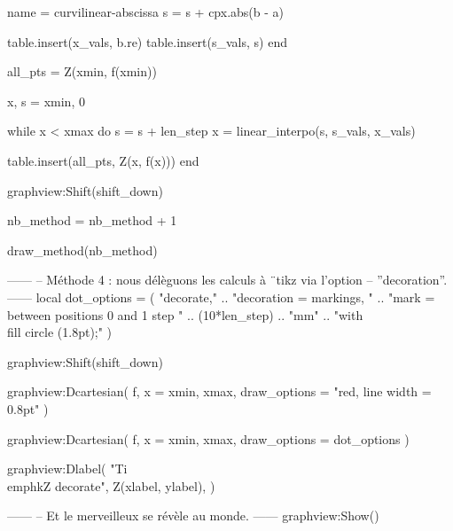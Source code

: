 \documentclass{standalone}
\begin{document}
\begin{luadraw}{name = curvilinear-abscissa}
  s = s + cpx.abs(b - a)

  table.insert(x_vals, b.re)
  table.insert(s_vals, s)
end

all_pts = {Z(xmin, f(xmin))}

x, s = xmin, 0

while x < xmax do
  s = s + len_step
  x = linear_interpo(s, s_vals, x_vals)

  table.insert(all_pts, Z(x, f(x)))
end

graphview:Shift(shift_down)

nb_method = nb_method + 1

draw_method(nb_method)

------
-- Méthode 4 : nous délèguons les calculs à ¨tikz via l'option
-- ''decoration''.
------
local dot_options = (
     "decorate,"
  .. "decoration = {markings, "
  .. "mark = between positions 0 and 1 step "
  .. (10*len_step) .. "mm"
  .. "with {\\fill circle (1.8pt);}}"
)

graphview:Shift(shift_down)

graphview:Dcartesian(
  f,
  {
    x = {xmin, xmax},
    draw_options = "red, line width = 0.8pt"
  }
)

graphview:Dcartesian(
  f,
  {
    x = {xmin, xmax},
    draw_options = dot_options
  }
)

graphview:Dlabel(
  "Ti\\emph{k}Z decorate", Z(xlabel, ylabel), {}
)

------
-- Et le merveilleux se révèle au monde.
------
graphview:Show()
\end{luadraw}
\end{document}

